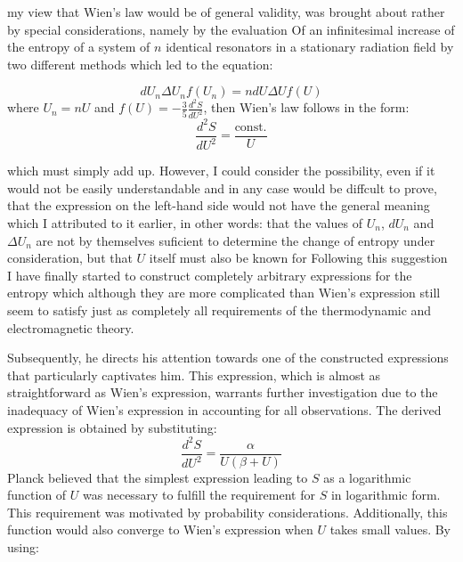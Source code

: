 \documentclass[9pt,a4paper, twocolumn]{article}
\newcounter{theo}
\begin{document}
            \begin{qt}
                my view that Wien's law would be of general validity, was brought about rather by special considerations, namely by the evaluation Of an infinitesimal increase of the entropy of a system of $n$ identical resonators in a stationary radiation field by two different methods which led to the equation:
            \end{qt}
            \begin{equation}
                dU_n\Delta U_n f(U_n) = ndU \Delta U f(U)
            \end{equation}
            where $U_n = nU$ and $f(U) = -\frac35\frac{d^2S}{dU^2}$, then Wien's law follows in the form:
            \begin{equation}
                \frac{d^2S}{dU^2} = \frac{\text{const.}}{U}
            \end{equation}
            \begin{qt}
                which must simply add up. However, I could consider the possibility, even if it would not be easily understandable and in any case would be diffcult to prove, that the expression on the left-hand side would not have the general meaning which I attributed to it earlier, in other words: that the values of $U_n$, $dU_n$ and $\Delta U_n$ are not by themselves suficient to determine the change of entropy under consideration, but that $U$ itself must also be known for Following this suggestion I have finally started to construct completely arbitrary expressions for the entropy which although they are more complicated than Wien's expression still seem to satisfy just as completely all requirements of the thermodynamic and electromagnetic theory.
            \end{qt}
            Subsequently, he directs his attention towards one of the constructed expressions that particularly captivates him. This expression, which is almost as straightforward as Wien's expression, warrants further investigation due to the inadequacy of Wien's expression in accounting for all observations. The derived expression is obtained by substituting:
            \begin{equation}
                \frac{d^2S}{dU^2} = \frac{\alpha}{U(\beta+U)}
            \end{equation}
            Planck believed that the simplest expression leading to $S$ as a logarithmic function of $U$ was necessary to fulfill the requirement for $S$ in logarithmic form. This requirement was motivated by probability considerations. Additionally, this function would also converge to Wien's expression when $U$ takes small values. By using:
\end{document}
